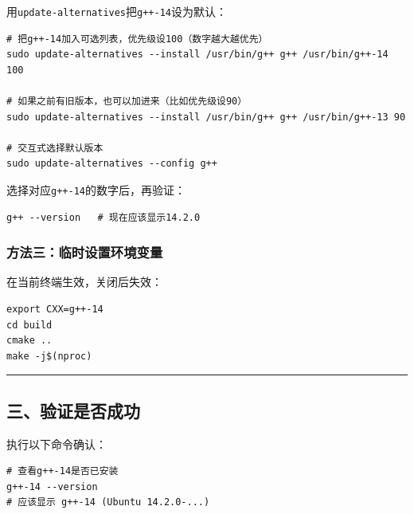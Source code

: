 \documentclass[11pt, a4paper]{article}
\begin{document}
\begin{aibox}
用\texttt{update-alternatives}把\texttt{g++-14}设为默认：

\begin{tcolorbox}[colback=white,colframe=gray!50!white,boxrule=0.5pt,arc=2pt,left=5pt,right=5pt,top=5pt,bottom=5pt]
\begin{verbatim}
# 把g++-14加入可选列表，优先级设100（数字越大越优先）
sudo update-alternatives --install /usr/bin/g++ g++ /usr/bin/g++-14 100

# 如果之前有旧版本，也可以加进来（比如优先级设90）
sudo update-alternatives --install /usr/bin/g++ g++ /usr/bin/g++-13 90

# 交互式选择默认版本
sudo update-alternatives --config g++
\end{verbatim}
\end{tcolorbox}

选择对应\texttt{g++-14}的数字后，再验证：

\begin{tcolorbox}[colback=white,colframe=gray!50!white,boxrule=0.5pt,arc=2pt,left=5pt,right=5pt,top=5pt,bottom=5pt]
\begin{verbatim}
g++ --version   # 现在应该显示14.2.0
\end{verbatim}
\end{tcolorbox}

\subsubsection*{方法三：临时设置环境变量}

在当前终端生效，关闭后失效：

\begin{tcolorbox}[colback=white,colframe=gray!50!white,boxrule=0.5pt,arc=2pt,left=5pt,right=5pt,top=5pt,bottom=5pt]
\begin{verbatim}
export CXX=g++-14
cd build
cmake ..
make -j$(nproc)
\end{verbatim}
\end{tcolorbox}

\begin{center}\rule{\textwidth}{0.4pt}\end{center}

\subsection*{三、验证是否成功}

执行以下命令确认：

\begin{tcolorbox}[colback=white,colframe=gray!50!white,boxrule=0.5pt,arc=2pt,left=5pt,right=5pt,top=5pt,bottom=5pt]
\begin{verbatim}
# 查看g++-14是否已安装
g++-14 --version
# 应该显示 g++-14 (Ubuntu 14.2.0-...)


\end{verbatim}
\end{tcolorbox}
\end{aibox}
\end{document}
